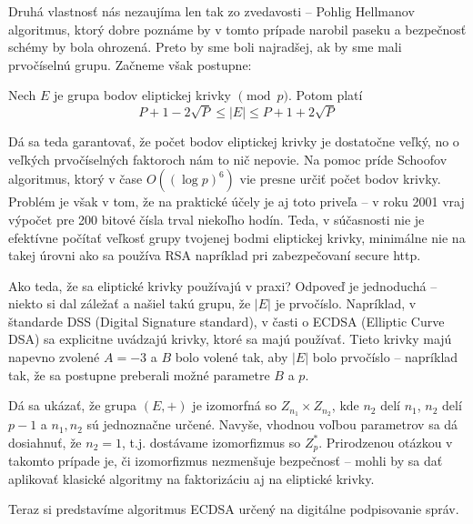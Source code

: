 Druhá vlastnosť nás nezaujíma len tak zo zvedavosti -- Pohlig Hellmanov
algoritmus, ktorý dobre poznáme by v tomto prípade narobil paseku a
bezpečnosť schémy by bola ohrozená. Preto by sme boli najradšej, ak by
sme mali prvočíselnú grupu. Začneme však postupne:

\begin{veta}
    Nech $E$ je grupa bodov eliptickej krivky $\pmod{p}$.
    Potom platí
    \begin{equation*}
        P+1 - 2 \sqrt{P} \le |E| \le P + 1 + 2 \sqrt{P}
    \end{equation*}
\end{veta}

Dá sa teda garantovať, že počet bodov eliptickej krivky je dostatočne
veľký, no o veľkých prvočíselných faktoroch nám to nič nepovie.
Na pomoc príde Schoofov algoritmus, ktorý v čase
$O((\log{p})^6)$ vie presne určiť počet bodov krivky. Problém je však
v tom, že na praktické účely je aj toto priveľa -- v roku 2001 vraj
výpočet pre 200 bitové čísla trval niekoľho hodín. Teda, v súčasnosti
nie je efektívne počítať veľkosť grupy tvojenej bodmi eliptickej
krivky, minimálne nie na takej úrovni ako sa používa RSA napríklad pri
zabezpečovaní secure http.

Ako teda, že sa eliptické krivky používajú v praxi? Odpoveď je
jednoduchá -- niekto si dal záležať a našiel takú grupu, že $|E|$ je
prvočíslo. Napríklad, v štandarde DSS (Digital Signature standard), v
časti o ECDSA (Elliptic Curve DSA) sa explicitne uvádzajú krivky,
ktoré sa majú používať. Tieto krivky majú napevno zvolené $A=-3$ a $B$
bolo volené tak, aby $|E|$ bolo prvočíslo -- napríklad tak, že sa
postupne preberali možné parametre $B$ a $p$.

\begin{poznamka}
    Dá sa ukázať, že grupa $(E,+)$ je izomorfná so
    $Z_{n_1} \times Z_{n_2}$, kde $n_2$ delí $n_1$, $n_2$ delí $p-1$ a
    $n_1,n_2$ sú jednoznačne určené.
    Navyše, vhodnou voľbou parametrov sa dá dosiahnuť, že
    $n_2=1$, t.j. dostávame izomorfizmus so $Z_p^*$. Prirodzenou
    otázkou v takomto prípade je, či izomorfizmus nezmenšuje
    bezpečnosť -- mohli by sa dať aplikovať klasické algoritmy na
    faktorizáciu aj na eliptické krivky. 
\end{poznamka}


Teraz si predstavíme algoritmus ECDSA určený na digitálne podpisovanie
správ.

